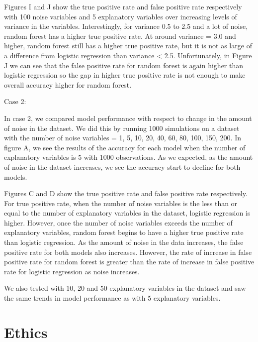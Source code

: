 \documentclass{llncs}
\begin{document}
Figures I and J show the true positive rate and false positive rate respectively with 100 noise variables and 5 explanatory variables over increasing levels of variance in the variables. Interestingly, for variance 0.5 to 2.5 and a lot of noise, random forest has a higher true positive rate.  At around variance = 3.0 and higher, random forest still has a higher true positive rate, but it is not as large of a difference from logistic regression than variance < 2.5.  Unfortunately, in Figure J we can see that the false positive rate for random forest is again higher than logistic regression so the gap in higher true positive rate is not enough to make overall accuracy higher for random forest.


Case 2:

In case 2, we compared model performance with respect to change in the amount of noise in the dataset. We did this by running 1000 simulations on a dataset with the number of noise variables = 1, 5, 10, 20, 40, 60, 80, 100, 150, 200.  In figure A, we see the results of the accuracy for each model when the number of explanatory variables is 5 with 1000 observations.  As we expected, as the amount of noise in the dataset increases, we see the accuracy start to decline for both models.

Figures C and D show the true positive rate and false positive rate respectively.  For true positive rate, when the number of noise variables is the less than or equal to the number of explanatory variables in the dataset, logistic regression is higher.  However, once the number of noise variables exceeds the number of explanatory variables, random forest begins to have a higher true positive rate than logistic regression.  As the amount of noise in the data increases, the false positive rate for both models also increases.  However, the rate of increase in false positive rate for random forest is greater than the rate of increase in false positive rate for logistic regression as noise increases.

We also tested with 10, 20 and 50 explanatory variables in the dataset and saw the same trends in model performance as with 5 explanatory variables.







\section{Ethics}
\end{document}
